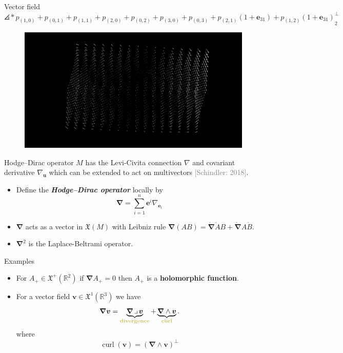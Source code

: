 \documentclass[aspectratio=169]{beamer}
\newcommand\boldgreen[1]{\textcolor{lighter_csu_green}{\emph{\textbf{#1}}}}
\newcommand\boldgold[1]{\textcolor{csu_gold}{\textbf{#1}}}
\newcommand\grey[1]{\textcolor{gray}{#1}}
\newcommand{\R}{\mathbb{R}}
\newcommand{\grad}{\boldsymbol{\nabla}}
\newcommand{\blade}[1]{\boldsymbol{#1}}
\newcommand{\contract}{\hspace*{.5mm} \lrcorner \hspace*{.5mm}}
\DeclarePairedDelimiter\angles{\langle}{\rangle}
\newcommand{\proj}[2]{\angles*{#2}_{#1}}
\newcommand{\smoothfields}{\mathfrak{X}}
\begin{document}
\begin{frame}{Vector field}
\vfill
\hspace*{-.5cm}$\proj{2}{p_{(1,0)}+p_{(0,1)} + p_{(1,1)} + p_{(2,0)} + p_{(0,2)} + p_{(3,0)} + p_{(0,3)} + p_{(2,1)} (1+\blade{e}_{31}) + p_{(1,2)} (1+\blade{e}_{31}) }^\perp$
\begin{figure}[h]
    \centering
    \includegraphics[width=\textwidth]{figures/vector_field}
\end{figure}
\hfill
\vfill
\end{frame}

\begin{frame}{Hodge--Dirac operator}
\vfill
\pause
    $M$ has the Levi-Civita connection $\nabla$ and covariant derivative $\nabla_{\blade{u}}$ which can be extended to act on multivectors \grey{[Schindler: 2018]}.
    \pause
    \begin{itemize}
        \item Define the \boldgreen{Hodge--Dirac operator} locally by
        \[
        \grad = \sum_{i=1}^n \blade{e}^i \nabla_{\blade{e}_i}
        \]
        \pause
        \item $\grad$ acts as a vector in $\smoothfields(M)$ with Leibniz rule $\grad(AB) = \dot{\grad}\dot{A}B + \dot{\grad}A\dot{B}$.
        \pause
        \item $\grad^2$ is the Laplace-Beltrami operator.
    \end{itemize}
\vfill
\end{frame}

\begin{frame}{Examples}
\vfill
\begin{itemize}
\pause
\item For $A_+ \in \smoothfields^+(\R^2)$ if $\grad A_+=0$ then $A_+$ is a \boldgold{holomorphic function}.
\pause
\item For a vector field $\blade{v}\in \smoothfields^1(\R^3)$ we have
    \[
    \grad \blade{v} = \underbrace{\grad \contract \blade{v}}_{\textrm{\boldgold{divergence}}} + \underbrace{\grad \wedge \blade{v}}_{\textrm{\boldgold{curl}}}.
    \]
where
\[
    \operatorname{curl}(\blade{v}) = (\grad \wedge \blade{v})^\perp
\]
\end{itemize}
\vfill
\end{frame}
\end{document}
